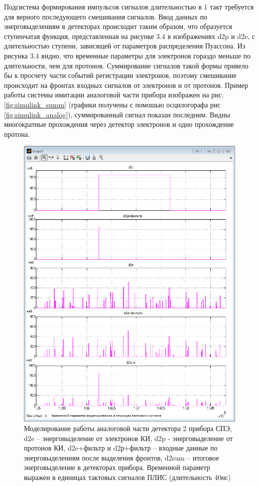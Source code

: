 Подсистема формирования импульсов сигналов длительностью в 1 такт требуется для верного последующего смешивания сигналов. Ввод данных по энерговыделениям в детекторах происходит таким образом, что образуется ступенчатая функция, представленная на рисунке 3.4 в изображениях d2p и d2e, с длительностью ступени, зависящей от параметров распределения Пуассона. Из рисунка 3.4 видно, что временные параметры для электронов гораздо меньше по длительности, чем для протонов. Суммирование сигналов такой формы привело бы к просчету части событий регистрации электронов, поэтому смешивание происходит на фронтах входных сигналов от электронов и от протонов.
Пример работы системы имитации аналоговой части прибора изображен на рис. \ref{fig:simulink_summ} (графики получены с помошью осцилогорафа рис \ref{fig:simulink_analog}), суммированный сигнал показан последним. Видны многократные прохождения через детектор электронов и одно прохождение протона. 
\begin{figure}
\centering
\includegraphics[width=0.7\linewidth]{images/simulink_analog_scope}
\caption[Моделирование работы аналоговой части прибора СПЭ]{Моделирование работы аналоговой части детектора 2 прибора СПЭ, d2e – энерговыделение от электронов КИ, d2p - энерговыделение от протонов КИ, d2e+фильтр и d2р+фильтр – входные данные по энерговыделениям после выделения фронтов,  d2sum – итоговое энерговыделение в детекторах прибора. Временной параметр выражен в единицах тактовых сигналов ПЛИС (длительность 40нс)}
\label{fig:simulink_analog_scope}
\end{figure}

